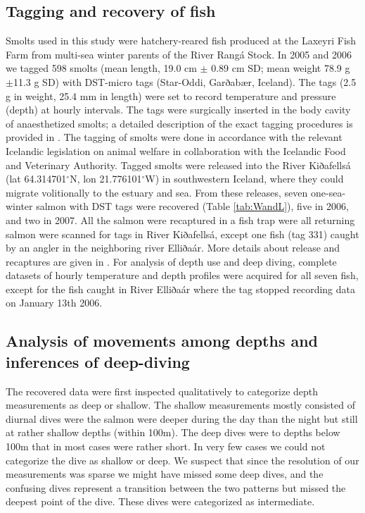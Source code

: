 \subsection{Tagging and recovery of fish}
Smolts used in this study were hatchery-reared fish produced at the Laxeyri Fish Farm from multi-sea winter parents of the River Rangá Stock. 
In 2005 and 2006 we tagged 598 smolts (mean length, 19.0 cm $\pm$ 0.89 cm SD; mean weight 78.9 g $\pm$11.3 g SD) with DST-micro tags (Star-Oddi, Garðabær, Iceland). 
The tags (2.5 g in weight, 25.4 mm in length) were set to record temperature and pressure (depth) at hourly intervals. 
The tags were surgically inserted in the body cavity of anaesthetized smolts; a detailed description of the exact tagging procedures is provided in \cite{Gudjonsson2015}. 
The tagging of smolts were done in accordance with the relevant Icelandic legislation on animal welfare in collaboration with the Icelandic Food and Veterinary Authority.
Tagged smolts were released into the River Kiðafellsá (lat 64.314701$^\circ$N, lon 21.776101$^\circ$W) in southwestern Iceland, where they could migrate volitionally to the estuary and sea. 
From these releases, seven one-sea-winter salmon with DST tags were recovered (Table \ref{tab:WandL}), five in 2006, and two in 2007. 
All the salmon were recaptured in a fish trap were all returning salmon  were scanned for tags in River Kiðafellsá, except one fish (tag 331) caught by an angler in the neighboring river Elliðaár. 
More details about release and recaptures are given in \cite{Gudjonsson2015}.
For analysis of depth use and deep diving, complete datasets of hourly temperature and depth profiles were acquired for all seven fish, except for the fish caught in River Elliðaár where the tag stopped recording data on January 13th 2006.

\subsection{Analysis of movements among depths and inferences of deep-diving}
The recovered data were first inspected qualitatively to categorize depth measurements as deep or shallow.  
The shallow measurements mostly consisted of diurnal dives were the salmon were deeper during the day than the night but still at rather shallow depths (within 100m). 
The deep dives were to depths below 100m that in most cases were rather short. In very few cases we could not categorize the dive as shallow or deep. 
We suspect that since the resolution of our measurements was sparse we might have missed some deep dives, and the confusing dives represent a transition between the two patterns but missed the deepest point of the dive. These dives were categorized as intermediate.

